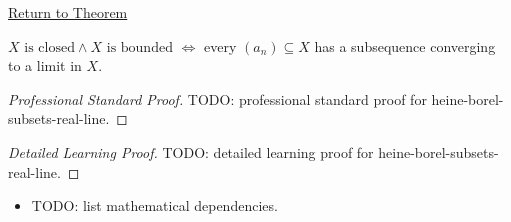 \newpage
{}
\label{prf:heine-borel-subsets-real-line}

\begin{remark*}[Return]
\hyperref[thm:heine-borel-subsets-real-line]{Return to Theorem}
\end{remark*}

\begin{theorem*}
$X\text{ is closed} \wedge X\text{ is bounded}$
$\iff$ every $(a_n)\subseteq X$ has a subsequence converging to
a limit in $X$.

\smallskip\noindent
\end{theorem*}

\begin{proof}[Professional Standard Proof]
\LRAProofBodyStart
TODO: professional standard proof for heine-borel-subsets-real-line.
\end{proof}

\begin{proof}[Detailed Learning Proof]
\LRAProofBodyStart
TODO: detailed learning proof for heine-borel-subsets-real-line.
\end{proof}

\begin{remark*}
\end{remark*}

\begin{dependencies}
\begin{itemize}
  \item TODO: list mathematical dependencies.
\end{itemize}
\end{dependencies}

\clearpage

